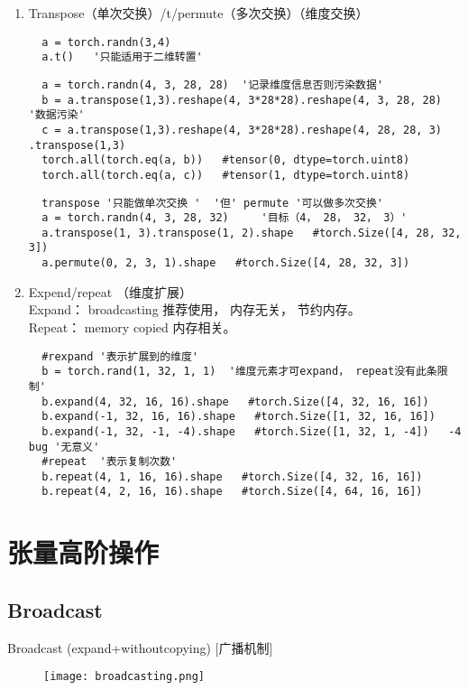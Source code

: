 \begin{enumerate}
  \item Transpose（单次交换）/t/permute（多次交换）（维度交换）
  \begin{lstlisting}
  a = torch.randn(3,4)
  a.t()   '只能适用于二维转置'
  \end{lstlisting}
  \begin{lstlisting}
  a = torch.randn(4, 3, 28, 28)  '记录维度信息否则污染数据'
  b = a.transpose(1,3).reshape(4, 3*28*28).reshape(4, 3, 28, 28)   '数据污染'
  c = a.transpose(1,3).reshape(4, 3*28*28).reshape(4, 28, 28, 3)   .transpose(1,3)
  torch.all(torch.eq(a, b))   #tensor(0, dtype=torch.uint8)
  torch.all(torch.eq(a, c))   #tensor(1, dtype=torch.uint8)
  \end{lstlisting}
  \begin{lstlisting}
  transpose '只能做单次交换 '  '但' permute '可以做多次交换'
  a = torch.randn(4, 3, 28, 32)     '目标（4， 28， 32， 3）'
  a.transpose(1, 3).transpose(1, 2).shape   #torch.Size([4, 28, 32, 3])
  a.permute(0, 2, 3, 1).shape   #torch.Size([4, 28, 32, 3])
  \end{lstlisting}

  \item Expend/repeat （维度扩展）\\
  Expand： broadcasting 推荐使用， 内存无关， 节约内存。\\
  Repeat： memory copied  内存相关。
  \begin{lstlisting}
  #rexpand '表示扩展到的维度'
  b = torch.rand(1, 32, 1, 1)  '维度元素才可expand， repeat没有此条限制'
  b.expand(4, 32, 16, 16).shape   #torch.Size([4, 32, 16, 16])
  b.expand(-1, 32, 16, 16).shape   #torch.Size([1, 32, 16, 16])
  b.expand(-1, 32, -1, -4).shape   #torch.Size([1, 32, 1, -4])   -4 bug '无意义'
  #repeat  '表示复制次数'
  b.repeat(4, 1, 16, 16).shape   #torch.Size([4, 32, 16, 16])
  b.repeat(4, 2, 16, 16).shape   #torch.Size([4, 64, 16, 16])
  \end{lstlisting}
\end{enumerate}





\newpage
\section{张量高阶操作}
\subsection{Broadcast}
Broadcast  (expand+withoutcopying) [广播机制]
\begin{figure}[!h]
  \centering
  \texttt{[image: broadcasting.png]}
\end{figure}

